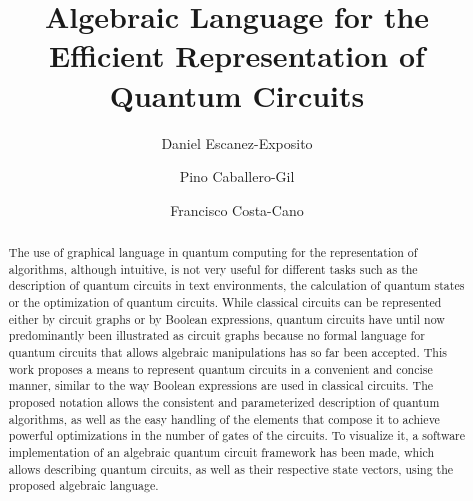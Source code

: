 \documentclass[sigconf,natbib=false]{acmart}
\begin{document}
\title[Algebraic Language for the Efficient Representation of Quantum Circuits]{Algebraic Language for the \\ Efficient Representation of Quantum Circuits}

\author{Daniel Escanez-Exposito}

\author{Pino Caballero-Gil}
\authornotemark[1]

\author{Francisco Costa-Cano}
\authornotemark[1]

\begin{abstract}
The use of graphical language in quantum computing for the representation of algorithms, although intuitive, is not very useful for different tasks such as the description of quantum circuits in text environments, the calculation of quantum states or the optimization of quantum circuits. While classical circuits can be represented either by circuit graphs or by Boolean expressions, quantum circuits have until now predominantly been illustrated as circuit graphs because no formal language for quantum circuits that allows algebraic manipulations has so far been accepted. This work proposes a means to represent quantum circuits in a convenient and concise manner, similar to the way Boolean expressions are used in classical circuits. The proposed notation allows the consistent and parameterized description of quantum algorithms, as well as the easy handling of the elements that compose it to achieve powerful optimizations in the number of gates of the circuits. To visualize it, a software implementation of an algebraic quantum circuit framework has been made, which allows describing quantum circuits, as well as their respective state vectors, using the proposed algebraic language.
\end{abstract}
\end{document}
